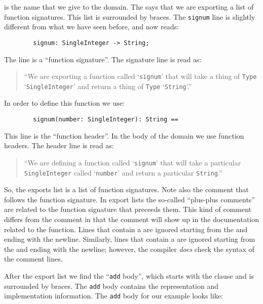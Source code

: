  is the name that we give to the domain. The
  says that we are exporting a list of function signatures. This
list is surrounded by braces. The \verb"signum" line is slightly
different from what we have seen before, and now reads:

\begin{small}%
\begin{verbatim}
        signum: SingleInteger -> String;
\end{verbatim}
\end{small}

The line is a ``function signature''. The signature line is read as:
\begin{quotation}
  ``We are exporting a function called `\verb"signum"'
   that will take a thing of \verb"Type" 
   `\verb"SingleInteger"' and return a thing of \verb"Type"
   `\verb"String"'.''
\end{quotation}
In order to define this function we use:

\begin{small}%
\begin{verbatim}
        signum(number: SingleInteger): String == 
\end{verbatim}
\end{small}

This line is the ``function header''. In the body of the domain we use function
headers. The header line is read as:
\begin{quotation}
  ``We are defining a function called `\verb"signum"' that will
   take a particular \verb"SingleInteger" called `\verb"number"'
   and return a particular \verb"String".''
\end{quotation}

So, the exports list is a list of function signatures.
Note also the \ttin{++} comment that follows the function signature.
In export lists the so-called ``plus-plus comments'' are related to the
function signature that preceeds them. This kind of comment differs
from the \ttin{--} comment in that the \ttin{++} comment will show up in the
documentation related to the function. Lines that contain a \ttin{--}
are ignored starting from the \ttin{--} and ending with the newline.
Similarly, lines that contain a \ttin{++}
are ignored starting from the \ttin{++} and ending with the newline;
however, the compiler {\em does} check the syntax of the \ttin{++} comment lines.

After the export list we find the ``\verb"add" body'', which starts with the
 clause and is surrounded by braces. The \verb"add" body
contains the representation and implementation information. The
\verb"add" body for our example looks like:

